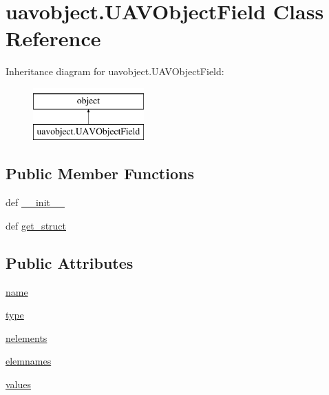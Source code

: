 \hypertarget{classuavobject_1_1_u_a_v_object_field}{\section{uavobject.\-U\-A\-V\-Object\-Field Class Reference}
\label{classuavobject_1_1_u_a_v_object_field}
}
Inheritance diagram for uavobject.\-U\-A\-V\-Object\-Field\-:\begin{figure}[H]
\begin{center}
\leavevmode
\includegraphics[height=2.000000cm]{classuavobject_1_1_u_a_v_object_field}
\end{center}
\end{figure}
\subsection*{Public Member Functions}
\begin{DoxyCompactItemize}
\item 
def \hyperlink{classuavobject_1_1_u_a_v_object_field_acf43e94abcf1a399fa8ca600c45e9415}{\-\_\-\-\_\-init\-\_\-\-\_\-}
\item 
def \hyperlink{classuavobject_1_1_u_a_v_object_field_a4abee82c924e2fa17da4dfa6ade368bf}{get\-\_\-struct}
\end{DoxyCompactItemize}
\subsection*{Public Attributes}
\begin{DoxyCompactItemize}
\item 
\hyperlink{classuavobject_1_1_u_a_v_object_field_a9b3f1adb03ed4293915011faf9ed93a9}{name}
\item 
\hyperlink{classuavobject_1_1_u_a_v_object_field_acc9aa14ec01184df177b6ef907073d1f}{type}
\item 
\hyperlink{classuavobject_1_1_u_a_v_object_field_a1041dbb74c1678d16fba30515fb1f47c}{nelements}
\item 
\hyperlink{classuavobject_1_1_u_a_v_object_field_a811dd2d5039fa7abbd22558619c2b363}{elemnames}
\item 
\hyperlink{classuavobject_1_1_u_a_v_object_field_a72f9d575e9fd6eaeb6842377e76ec8fe}{values}
\end{DoxyCompactItemize}


